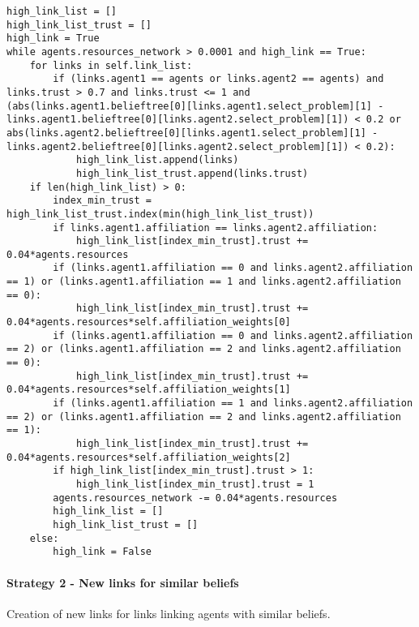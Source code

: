 \begin{lstlisting}
high_link_list = []
high_link_list_trust = []
high_link = True
while agents.resources_network > 0.0001 and high_link == True:
	for links in self.link_list:
		if (links.agent1 == agents or links.agent2 == agents) and links.trust > 0.7 and links.trust <= 1 and (abs(links.agent1.belieftree[0][links.agent1.select_problem][1] - links.agent1.belieftree[0][links.agent2.select_problem][1]) < 0.2 or abs(links.agent2.belieftree[0][links.agent1.select_problem][1] - links.agent2.belieftree[0][links.agent2.select_problem][1]) < 0.2):
			high_link_list.append(links)
			high_link_list_trust.append(links.trust)
	if len(high_link_list) > 0:
		index_min_trust = high_link_list_trust.index(min(high_link_list_trust))
		if links.agent1.affiliation == links.agent2.affiliation:
			high_link_list[index_min_trust].trust += 0.04*agents.resources
		if (links.agent1.affiliation == 0 and links.agent2.affiliation == 1) or (links.agent1.affiliation == 1 and links.agent2.affiliation == 0):
			high_link_list[index_min_trust].trust += 0.04*agents.resources*self.affiliation_weights[0]
		if (links.agent1.affiliation == 0 and links.agent2.affiliation == 2) or (links.agent1.affiliation == 2 and links.agent2.affiliation == 0):
			high_link_list[index_min_trust].trust += 0.04*agents.resources*self.affiliation_weights[1]
		if (links.agent1.affiliation == 1 and links.agent2.affiliation == 2) or (links.agent1.affiliation == 2 and links.agent2.affiliation == 1):
			high_link_list[index_min_trust].trust += 0.04*agents.resources*self.affiliation_weights[2]
		if high_link_list[index_min_trust].trust > 1:
			high_link_list[index_min_trust].trust = 1
		agents.resources_network -= 0.04*agents.resources
		high_link_list = []
		high_link_list_trust = []
	else:
		high_link = False
\end{lstlisting}

\paragraph{Strategy 2 - New links for similar beliefs}

Creation of new links for links linking agents with similar beliefs.

